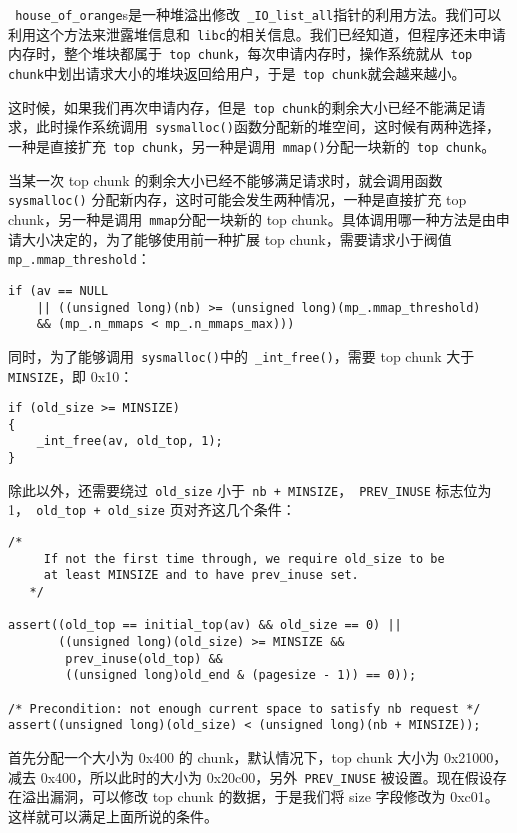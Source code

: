 \verb+ house_of_orange+s是一种堆溢出修改\verb+ _IO_list_all+指针的利用方法。我们可以利用这个方法来泄露堆信息和\verb+ libc+的相关信息。我们已经知道，但程序还未申请内存时，整个堆块都属于\verb+ top chunk+，每次申请内存时，操作系统就从\verb+ top chunk+中划出请求大小的堆块返回给用户，于是\verb+ top chunk+就会越来越小。

这时候，如果我们再次申请内存，但是\verb+ top chunk+的剩余大小已经不能满足请求，此时操作系统调用\verb+ sysmalloc()+函数分配新的堆空间，这时候有两种选择，一种是直接扩充\verb+ top chunk+，另一种是调用\verb+ mmap()+分配一块新的\verb+ top chunk+。

当某一次 top chunk 的剩余大小已经不能够满足请求时，就会调用函数\verb+ sysmalloc()+ 分配新内存，这时可能会发生两种情况，一种是直接扩充 top chunk，另一种是调用\verb+ mmap+分配一块新的 top chunk。具体调用哪一种方法是由申请大小决定的，为了能够使用前一种扩展 top chunk，需要请求小于阀值\verb+ mp_.mmap_threshold+：
\begin{verbatim}
if (av == NULL 
    || ((unsigned long)(nb) >= (unsigned long)(mp_.mmap_threshold) 
    && (mp_.n_mmaps < mp_.n_mmaps_max)))
\end{verbatim}

同时，为了能够调用\verb+ sysmalloc()+中的\verb+ _int_free()+，需要 top chunk 大于 \verb+ MINSIZE+，即 0x10：
\begin{verbatim}
if (old_size >= MINSIZE)
{
    _int_free(av, old_top, 1);
}
\end{verbatim}

除此以外，还需要绕过\verb+ old_size+ 小于\verb| nb + MINSIZE|，\verb+ PREV_INUSE+ 标志位为 1，\verb| old_top + old_size| 页对齐这几个条件：
\begin{verbatim}
/*
     If not the first time through, we require old_size to be
     at least MINSIZE and to have prev_inuse set.
   */

assert((old_top == initial_top(av) && old_size == 0) ||
       ((unsigned long)(old_size) >= MINSIZE &&
        prev_inuse(old_top) &&
        ((unsigned long)old_end & (pagesize - 1)) == 0));

/* Precondition: not enough current space to satisfy nb request */
assert((unsigned long)(old_size) < (unsigned long)(nb + MINSIZE));

\end{verbatim}

首先分配一个大小为 0x400 的 chunk，默认情况下，top chunk 大小为 0x21000，减去 0x400，所以此时的大小为 0x20c00，另外\verb+ PREV_INUSE+ 被设置。现在假设存在溢出漏洞，可以修改 top chunk 的数据，于是我们将 size 字段修改为 0xc01。这样就可以满足上面所说的条件。

